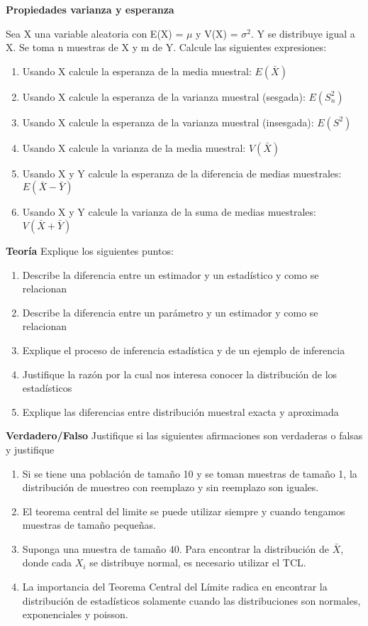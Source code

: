 \documentclass[addpoints]{exam}
\theoremstyle{mytheor}
\begin{document}
  \begin{questions}
  
  \question \textbf{Propiedades varianza y esperanza}
  
Sea X una variable aleatoria con E(X) = $\mu$ y V(X) = $\sigma^2$. Y se distribuye igual a X. Se toma n muestras de X y m de Y. Calcule las siguientes expresiones:
  
  \begin{enumerate}
  \item Usando X calcule la esperanza de la media muestral: $E(\bar{X})$
  \item Usando X calcule la esperanza de la varianza muestral (sesgada): $E(S_n^2) $
  \item Usando X calcule la esperanza de la varianza muestral (insesgada): $E(S^2)$
  \item Usando X calcule la varianza de la media muestral: $V(\bar{X})$
  \item Usando X y Y calcule la esperanza de la diferencia de medias muestrales: $E(\bar{X} - \bar{Y})$
  \item Usando X y Y calcule la varianza de la suma de medias muestrales: $V(\bar{X} + \bar{Y})$
  \end{enumerate}
  
  \question \textbf{Teoría}
  Explique los siguientes puntos:
  \begin{enumerate}
  \item Describe la diferencia entre un estimador y un estadístico y como se relacionan
  \item Describe la diferencia entre un parámetro y un estimador y como se relacionan
  \item Explique el proceso de inferencia estadística y de un ejemplo de inferencia
  \item Justifique la razón por la cual nos interesa conocer la distribución de los estadísticos
  \item Explique las diferencias entre distribución muestral exacta y aproximada
  \end{enumerate}
  
  \question \textbf{Verdadero/Falso}
  Justifique si las siguientes afirmaciones son verdaderas o falsas y justifique 
  \begin{enumerate}
  \item Si se tiene una población de tamaño 10 y se toman muestras de tamaño 1, la distribución de muestreo con reemplazo y sin reemplazo son iguales. 
  \item El teorema central del limite se puede utilizar siempre y cuando tengamos muestras de tamaño pequeñas.
  \item Suponga una muestra de tamaño 40. Para encontrar la distribución de $\bar{X}$, donde cada $X_i$ se distribuye normal, es necesario utilizar el TCL.
  \item La importancia del Teorema Central del Límite radica en encontrar la distribución de estadísticos solamente cuando las distribuciones son normales, exponenciales y poisson. 
  \end{enumerate}
  
  \end{questions}
  
\end{document}
